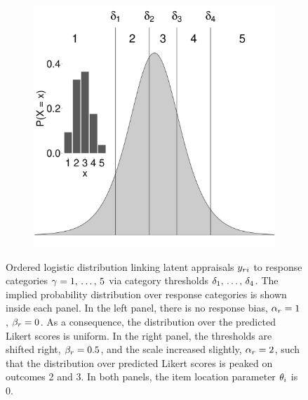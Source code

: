 \documentclass[a4paper,usenames,dvipsnames]{article}
\newenvironment{revision}{\color{teal}}{\color{black}}
\begin{document}
\begin{figure}[!ht]
\begin{subfigure}{.5\textwidth}
		\includegraphics[width=.97\textwidth]{figures/orderedLogisticBiased.pdf}
	\end{subfigure}
	\caption{
		\begin{revision}Ordered logistic distribution linking latent appraisals $y_{ri}$ to response categories $\gamma = 1,\,\dots,\,5$  via category thresholds $\delta_1,\,\dots,\,\delta_4$.\end{revision}
		The implied probability distribution over response categories is shown inside each panel. In the left panel, there is no response bias, $\alpha_r = 1$, $\beta_r = 0$. As a consequence, the distribution over the predicted Likert scores is uniform. In the right panel, the thresholds are shifted right, $\beta_r = 0.5$, and the scale increased slightly, $\alpha_r = 2$, such that the distribution over predicted Likert scores is peaked on outcomes 2 and 3. \begin{revision}In both panels, the item location parameter $\theta_i$ is 0.\end{revision}}
	\label{fig:orderedLogistic}
\end{figure}
\end{document}
